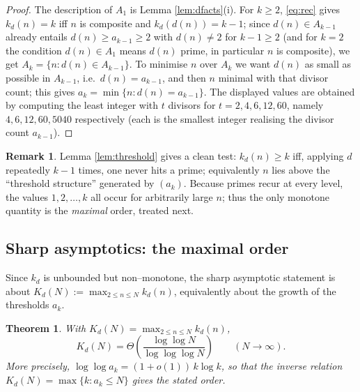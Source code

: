\documentclass{amsart}
\newtheorem{theorem}{Theorem}
\theoremstyle{definition}
\newtheorem{remark}{Remark}
\begin{document}
\begin{proof}
The description of $A_1$ is Lemma \ref{lem:dfacts}(i). For $k\ge2$,
\eqref{eq:rec} gives $k_d(n)=k$ iff $n$ is composite and $k_d(d(n))=k-1$;
since $d(n)\in A_{k-1}$ already entails $d(n)\ge a_{k-1}\ge 2$ with
$d(n)\neq 2$ for $k-1\ge2$ (and for $k=2$ the condition $d(n)\in A_1$ means
$d(n)$ prime, in particular $n$ is composite), we get
$A_k=\{n:d(n)\in A_{k-1}\}$. To minimise $n$ over $A_k$ we want $d(n)$ as
small as possible in $A_{k-1}$, i.e.\ $d(n)=a_{k-1}$, and then $n$ minimal with
that divisor count; this gives $a_k=\min\{n:d(n)=a_{k-1}\}$. The displayed
values are obtained by computing the least integer with $t$ divisors for
$t=2,4,6,12,60$, namely $4,6,12,60,5040$ respectively (each is the smallest
integer realising the divisor count $a_{k-1}$).
\end{proof}

\begin{remark}
Lemma \ref{lem:threshold} gives a clean test: $k_d(n)\ge k$ iff, applying $d$
repeatedly $k-1$ times, one never hits a prime; equivalently $n$ lies above the
``threshold structure'' generated by $(a_k)$. Because primes recur at every
level, the values $1,2,\dots,k$ all occur for arbitrarily large $n$; thus the
only monotone quantity is the \emph{maximal} order, treated next.
\end{remark}

\subsection{Sharp asymptotics: the maximal order}

Since $k_d$ is unbounded but non--monotone, the sharp asymptotic statement is
about $K_d(N):=\max_{2\le n\le N}k_d(n)$, equivalently about the growth of the
thresholds $a_k$.

\begin{theorem}\label{thm:Kd}
With $K_d(N)=\max_{2\le n\le N}k_d(n)$,
\[
K_d(N)=\Theta\!\left(\frac{\log\log N}{\log\log\log N}\right)
\qquad(N\to\infty).
\]
More precisely, $\log\log a_k=(1+o(1))\,k\log k$, so that the inverse relation
$K_d(N)=\max\{k:a_k\le N\}$ gives the stated order.
\end{theorem}
\end{document}
